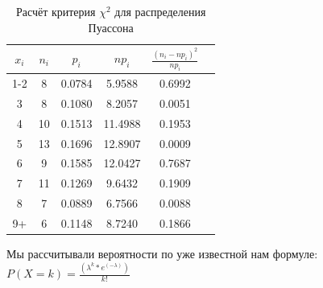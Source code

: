 \documentclass[12pt]{article}
\begin{document}
\begin{table}[h]
\begin{tabular}{ |c|c|c|c|c|c| }
\hline
$x_i$ & $n_i$ & $p_i$ & $np_i$ & $\frac{(n_i - np_i)^2}{np_i}$ \\
\hline
1-2 & 8 & 0.0784 & 5.9588 & 0.6992 \\
\hline
3 & 8 & 0.1080 & 8.2057 & 0.0051 \\
\hline
4 & 10 & 0.1513 & 11.4988 & 0.1953 \\
\hline
5 & 13 & 0.1696 & 12.8907 & 0.0009 \\
\hline
6 & 9 & 0.1585 & 12.0427 & 0.7687 \\
\hline
7 & 11 & 0.1269 & 9.6432 & 0.1909 \\
\hline
8 & 7 & 0.0889 & 6.7566 & 0.0088 \\
\hline
9+ & 6 & 0.1148 & 8.7240 & 0.1866 \\
\hline
\end{tabular}
\centering
\caption{Расчёт критерия $\chi^2$ для распределения Пуассона}
\end{table}
\vspace{5mm}

Мы рассчитывали вероятности по уже известной нам формуле: $P(X = k) = \frac{(\lambda^k * e^{(-\lambda)})}{k!}$
\end{document}
